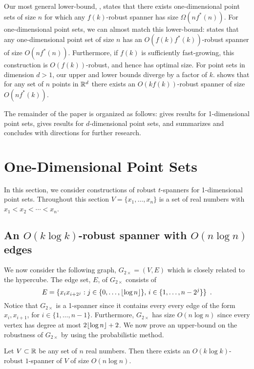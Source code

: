 \documentclass{patmorin}
\begin{document}
Our most general lower-bound, ,
states that there exists one-dimensional point sets of size $n$
for which any $f(k)$-robust spanner has size $\Omega(nf^*(n))$.
For one-dimensional point sets, we can almost match this lower-bound:
 states that any one-dimensional point set of
size $n$ has an $O(f(k)f^*(k))$-robust spanner of size $O(nf^*(n))$.
Furthermore, if $f(k)$ is sufficiently fast-growing, this construction
is $O(f(k))$-robust, and hence has optimal size.  For point sets in
dimension $d>1$, our upper and lower bounds diverge by a factor of $k$.
 shows that for any set of $n$ points in $\mathbb{R}^d$ there exists
an $O(kf(k))$-robust spanner of size $O(nf^*(k))$.

The remainder of the paper is organized as follows:  
gives results for 1-dimensional point sets,  gives results
for $d$-dimensional point sets, and  summarizes and
concludes with directions for further research.


\section{One-Dimensional Point Sets}

In this section, we consider constructions of robust $t$-spanners for
1-dimensional point sets.  Throughout this section $V=\{x_1,\ldots,x_n\}$
is a set of real numbers with $x_1<x_2<\cdots<x_n$.

\subsection{An $O(k\log k)$-robust spanner with $O(n\log n)$ edges}

We now consider the following graph, $G_{2\times}=(V,E)$ which is
closely related to the hypercube.   The edge set, $E$, of $G_{2\times}$
consists of
\[
  E = \{x_ix_{i+2^j} : j\in\{0,\ldots,{\lfloor \log n \rfloor}\},\, 
        i\in\{1,\ldots,n-2^j\} \} \enspace .
\] 
Notice that $G_{2\times}$ is a 1-spanner since it contains every every
edge of the form $x_i,x_{i+1}$, for $i\in\{1,\ldots,n-1\}$. Furthermore,
$G_{2\times}$ has size $O(n\log n)$ since every vertex has degree at most
$2{\lfloor \log n \rfloor}+2$.  We now prove an upper-bound on the robustness of
$G_{2\times}$ by using the probabilistic method.

\begin{thm}
  Let $V\subset \mathbb{R}$ be any set of $n$ real numbers.  Then there exists
  an $O(k\log k)$-robust $1$-spanner of $V$ of size $O(n\log n)$.
\end{thm}
\end{document}
